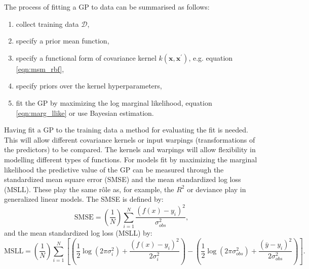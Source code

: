 The process of fitting a GP to data can be summarised as follows:
\begin{enumerate}
    \item collect training data $\mathcal{D}$, 
    \item specify a prior mean function, 
    \item  specify a functional form of covariance kernel $k(\mathbf{x}, \mathbf{x}^{\prime})$, e.g. equation \ref{eqn:msm_rbf}, 
    \item specify priors over the kernel hyperparameters, 
    \item fit the GP by maximizing the log marginal likelihood, equation \ref{eqn:marg_llike} or use Bayesian estimation. 
\end{enumerate}

Having fit a GP to the training data a method for evaluating the fit is needed. This will allow different covariance kernels or input warpings (transformations of the predictors) to be compared. The kernels and warpings will allow flexibility in modelling different types of functions. For models fit by maximizing the marginal likelihood the predictive value of the GP can be measured through the standardized mean square error (SMSE) and the mean standardized log loss (MSLL)\cite{rasmussenGaussianProcessesMachine2006}. These play the same r\^ole as, for example, the $R^2$ or deviance play in generalized linear models\cite{nelder1972generalized}. The SMSE is defined by\cite{rasmussenGaussianProcessesMachine2006}:
\begin{equation}\label{eqn:smse}
\mathrm{SMSE} =\left(\frac{1}{N}\right) \sum_{i=1}^{N} \frac{\left(f(x)-y_{i}\right)^{2}}{\sigma_{obs}^{2}},
\end{equation}
and the mean standardized log loss (MSLL) by\cite{rasmussenGaussianProcessesMachine2006}:
\begin{equation}\label{eqn:msll}
\mathrm{MSLL}=\left(\frac{1}{N}\right) \sum_{i=1}^{N}\left[\left(\frac{1}{2} \log \left(2 \pi \sigma_{i}^{2}\right)+\frac{\left(f(x)-y_{i}\right)^{2}}{2\sigma_{i}^{2}}\right)-\left(\frac{1}{2} \log \left(2 \pi \sigma_{obs}^{2}\right)+\frac{\left(\bar{y}-y_{i}\right)^{2}}{2\sigma_{obs}^{2}}\right)\right].
\end{equation}  

